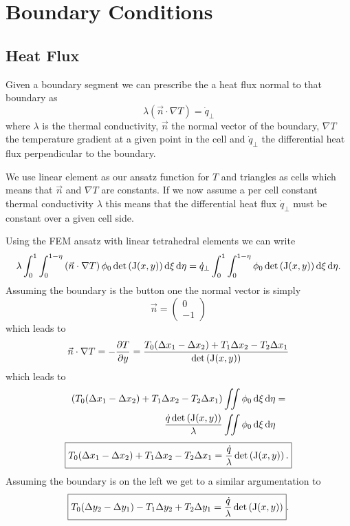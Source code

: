 \chapter{Boundary Conditions}

\section{Heat Flux}
Given a boundary segment we can prescribe the a heat flux normal to that boundary as
\begin{equation}
	\lambda \left(\vec{n} \cdot \nabla T \right) = \dot{q}_{\perp}
\end{equation}
where $\lambda$ is the thermal conductivity, $\vec{n}$ the normal vector of the boundary, $\nabla T$ the temperature gradient at a given point in the cell and $\dot{q}_{\perp}$ the differential heat flux perpendicular to the boundary.

We use linear element as our ansatz function for $T$ and triangles as cells which means that $\vec{n}$ and $\nabla T$ are constants.
If we now assume a per cell constant thermal conductivity $\lambda$ this means that the differential heat flux $\dot{q}_{\perp}$ must be constant over a given cell side.

Using the FEM ansatz with linear tetrahedral elements we can write
\begin{equation}
	\lambda \int_0^1 \int_0^{1 - \eta} \left( \vec{n} \cdot \nabla T \right) \phi_0 \det\left( \mathrm{J}(x, y) \right) \mathop{}\!\mathrm{d}{\xi} \mathop{}\!\mathrm{d}{\eta} = \dot{q}_{\perp} \int_0^1 \int_0^{1 - \eta} \phi_0 \det\left( \mathrm{J}(x, y) \right) \mathop{}\!\mathrm{d}{\xi} \mathop{}\!\mathrm{d}{\eta}.
\end{equation}
Assuming the boundary is the button one the normal vector is simply
\begin{equation}
	\vec{n} = 
	\begin{pmatrix}
	0\\
	-1
	\end{pmatrix}
\end{equation}
which leads to
\begin{equation}
	\vec{n} \cdot \nabla T = -\pdv{T}{y} = \frac{T_0(\Delta x_1 - \Delta x_2) + T_1 \Delta x_2 - T_2 \Delta x_1}{\det\left(\mathrm{J}(x,y)\right)}
\end{equation}
which leads to
\begin{align}
	\left( T_0(\Delta x_1 - \Delta x_2) + T_1 \Delta x_2 - T_2 \Delta x_1\right) &\iint \phi_0 \mathop{}\!\mathrm{d}{\xi} \mathop{}\!\mathrm{d}{\eta} =\\
	\frac{\dot{q} \det\left( \mathrm{J}(x, y) \right)}{\lambda} &\iint \phi_0 \mathop{}\!\mathrm{d}{\xi} \mathop{}\!\mathrm{d}{\eta}
\end{align}
\begin{equation}
	\boxed{T_0(\Delta x_1 - \Delta x_2) + T_1 \Delta x_2 - T_2 \Delta x_1 =
	\frac{\dot{q}}{\lambda} \det\left( \mathrm{J}(x, y) \right).}
\end{equation}
Assuming the boundary is on the left we get to a similar argumentation to
\begin{equation}
	\boxed{T_0(\Delta y_2 - \Delta y_1) - T_1\Delta y_2 + T_2\Delta y_1 =
	\frac{\dot{q}}{\lambda} \det\left( \mathrm{J}(x, y) \right)}.
\end{equation}

